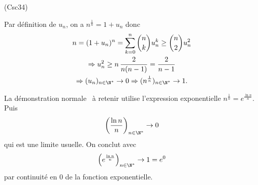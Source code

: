 \begin{tiny}(Csc34)\end{tiny} Par définition de $u_n$, on a $n^{\frac{1}{n}} = 1 + u_n$ donc 
\begin{multline*}
n = (1+u_n)^n 
  = \sum_{k=0}^n \binom{n}{k} u_n^k 
  \geq \binom{n}{2} u_n^2 \\
  \Rightarrow u_n^2 \geq n\, \frac{2}{n(n-1)}= \frac{2}{n-1}\\ 
  \Rightarrow (u_n)_{n\in \N^*} \rightarrow 0 
  \Rightarrow (n^{\frac{1}{n}})_{n\in \N^*} \rightarrow 1.
\end{multline*}

La démonstration  \og normale\fg~ à retenir utilise l'expression exponentielle $n^{\frac{1}{n}} = e ^{\frac{\ln n}{n}}$. Puis
\[
  \left( \frac{\ln n}{n}\right)_{n\in \N^*} \rightarrow 0
\]
qui est une limite usuelle. On conclut avec
\[
  \left( e^{\frac{\ln n}{n}}\right)_{n\in \N^*} \rightarrow 1 = e^0  
\]
par continuité en $0$ de la fonction exponentielle.

